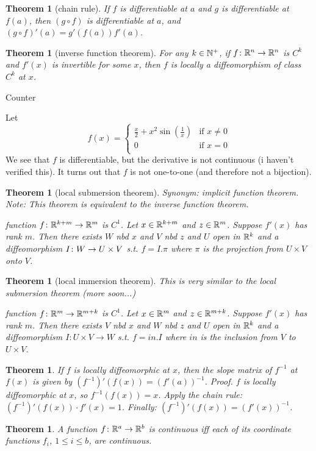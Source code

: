\documentclass[11pt]{amsbook}
\theoremstyle{mystyle} %
\newtheorem{thrm}[thm]{Theorem}
\numberwithin{thm}{section}
\begin{document}
\begin{thrm}[chain rule]
	If $f$ is differentiable at $a$ and $g$ is differentiable at $f(a)$, then $(g \circ f)$ is differentiable at $a$, and $(g \circ f)'(a) = g'(f(a))f'(a)$.
\end{thrm}
\begin{thrm}[inverse function theorem]
	For any $k \in {\mathbb N}^+$, if $f\colon {\mathbb R}^n \to {\mathbb R}^n$ is $C^k$ and $f'(x)$ is invertible for some $x$, then $f$ is locally a diffeomorphism of class $C^k$ at $x$.
\end{thrm}
\begin{example}
	Counter\end{example}
\begin{example}
	Let $$f(x) =
	\begin{cases}
		\frac{x}{2} + x^2\sin\left(\frac 1x\right)	&\text{if $x \neq 0$} \\
		0											&\text{if $x=0$} \\
	\end{cases}
	$$  We see that $f$ is differentiable, but the derivative is not continuous (i haven't verified this).  It turns out that $f$ is not one-to-one (and therefore not a bijection).
\end{example}
\begin{thrm}[local submersion theorem]
	Synonym: implicit function theorem.
	Note: This theorem is equivalent to the inverse function theorem.

	function $f \colon {\mathbb R}^{k+m} \to {\mathbb R}^m$ is $C^1$.
	Let $x \in {\mathbb R}^{k+m}$ and $z \in {\mathbb R}^m$.
	Suppose $f'(x)$ has rank $m$.
	Then there exists $W$ nbd $x$ and $V$ nbd $z$ and $U$ open in ${\mathbb R}^k$ and a diffeomorphism $I \colon W \to U \times V$
	s.t. $f = I.\pi$ where $\pi$ is the projection from $U \times V$ onto $V$.
\end{thrm}
\begin{thrm}[local immersion theorem]
	This is very similar to the local submersion theorem (more soon...)

	function $f \colon {\mathbb R}^{m} \to {\mathbb R}^{m+k}$ is $C^1$.
	Let $x \in {\mathbb R}^{m}$ and $z \in {\mathbb R}^{m+k}$.
	Suppose $f'(x)$ has rank $m$.
	Then there exists $V$ nbd $x$ and $W$ nbd $z$ and $U$ open in ${\mathbb R}^k$ and a diffeomorphism $I : U \times V \to W$
	s.t. $f = in.I$ where $in$ is the inclusion from $V$ to $U \times V$.
\end{thrm}
\begin{thrm}
	If $f$ is locally diffeomorphic at $x$, then the slope matrix of $f^{-1}$ at $f(x)$ is given by $(f^{-1})'(f(x)) = (f'(a))^{-1}$.
	Proof. $f$ is locally diffeomorphic at $x$, so $f^{-1}(f(x)) = x$.
	Apply the chain rule: $(f^{-1})'(f(x)) \cdot f'(x) = 1$.
	Finally: $(f^{-1})'(f(x)) = (f'(x))^{-1}$.
\end{thrm}
\begin{thrm}
	A function $f \colon {\mathbb R}^a \to {\mathbb R}^b$ is continuous iff each of its coordinate functions $f_i$, $1\leq i \leq b$, are continuous.
\end{thrm}
\end{document}
